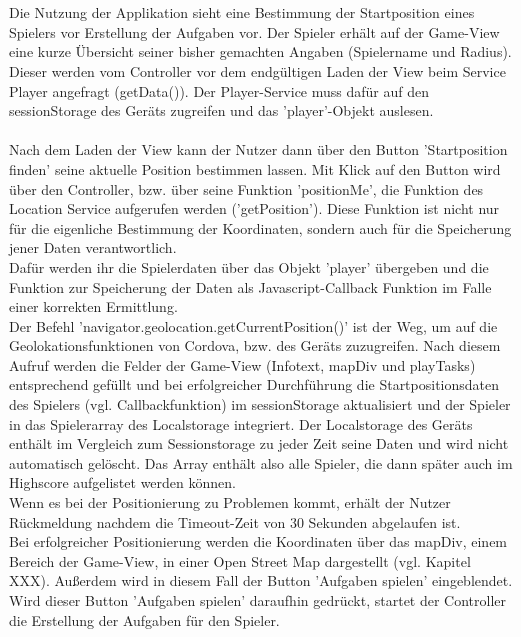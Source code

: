 \\
\\
Die Nutzung der Applikation sieht eine Bestimmung der Startposition eines Spielers vor Erstellung der Aufgaben vor. Der Spieler erhält auf der Game-View eine kurze Übersicht seiner bisher gemachten Angaben (Spielername und Radius). Dieser werden vom Controller vor dem endgültigen Laden der View beim Service Player angefragt (getData()). Der Player-Service muss dafür auf den sessionStorage des Geräts zugreifen und das 'player'-Objekt auslesen.
\\
\\
Nach dem Laden der View kann der Nutzer dann über den Button 'Startposition finden' seine aktuelle Position bestimmen lassen. Mit Klick auf den Button wird über den Controller, bzw. über seine Funktion 'positionMe', die Funktion des Location Service aufgerufen werden ('getPosition'). Diese Funktion ist nicht nur für die eigenliche Bestimmung der Koordinaten, sondern auch für die Speicherung jener Daten verantwortlich.
\\
Dafür werden ihr die Spielerdaten über das Objekt 'player' übergeben und die Funktion zur Speicherung der Daten als Javascript-Callback Funktion im Falle einer korrekten Ermittlung.
\\
Der Befehl 'navigator.geolocation.getCurrentPosition()' ist der Weg, um auf die Geolokationsfunktionen von Cordova, bzw. des Geräts zuzugreifen. Nach diesem Aufruf werden die Felder der Game-View (Infotext, mapDiv und playTasks) entsprechend gefüllt und bei erfolgreicher Durchführung die Startpositionsdaten des Spielers (vgl. Callbackfunktion) im sessionStorage aktualisiert und der Spieler in das Spielerarray des Localstorage integriert. Der Localstorage des Geräts enthält im Vergleich zum Sessionstorage zu jeder Zeit seine Daten und wird nicht automatisch gelöscht. Das Array enthält also alle Spieler, die dann später auch im Highscore aufgelistet werden können.
\\
Wenn es bei der Positionierung zu Problemen kommt, erhält der Nutzer Rückmeldung nachdem die Timeout-Zeit von 30 Sekunden abgelaufen ist.
\\
Bei erfolgreicher Positionierung werden die Koordinaten über das mapDiv, einem Bereich der Game-View, in einer Open Street Map dargestellt (vgl. Kapitel XXX). Außerdem wird in diesem Fall der Button 'Aufgaben spielen' eingeblendet.
\\
Wird dieser Button 'Aufgaben spielen' daraufhin gedrückt, startet der Controller die Erstellung der Aufgaben für den Spieler.
